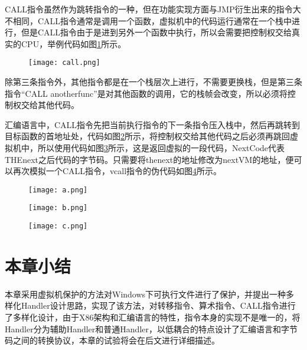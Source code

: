 CALL指令虽然作为跳转指令的一种，但在功能实现方面与JMP衍生出来的指令大不相同，CALL指令通常是调用一个函数，虚拟机中的代码运行通常在一个栈中进行，但是CALL指令由于是进到另外一个函数中执行，所以会需要把控制权交给真实的CPU，举例代码如图\ref{call1}所示。

\begin{figure}[htbp]
	\centering
	\texttt{[image: call.png]}
	\label{call1}
\end{figure}

除第三条指令外，其他指令都是在一个栈层次上进行，不需要更换栈，但是第三条指令“CALL anotherfunc”是对其他函数的调用，它的栈帧会改变，所以必须将控制权交给其他代码。

汇编语言中，CALL指令先把当前执行指令的下一条指令压入栈中，然后再跳转到目标函数的首地址处，代码如图\ref{a}所示，将控制权交给其他代码之后必须再跳回虚拟机中，所以使用代码如图\ref{b}所示，这是返回虚拟的一段代码，NextCode代表THEnext之后代码的字节码。只需要将thenext的地址修改为nextVM的地址，便可以再次模拟一个CALL指令，vcall指令的伪代码如图\ref{c}所示。


\begin{figure}[htbp]
	\centering
	\texttt{[image: a.png]}
	\label{a}
\end{figure}

\begin{figure}[htbp]
	\centering
	\texttt{[image: b.png]}
	\label{b}
\end{figure}

\begin{figure}[htbp]
	\centering
	\texttt{[image: c.png]}
	\label{c}
\end{figure}



\section{本章小结}
本章采用虚拟机保护的方法对Windows下可执行文件进行了保护，并提出一种多样化Handler设计思路，实现了该方法，对转移指令、算术指令、CALL指令进行了多样化设计，由于X86架构和汇编语言的特性，指令本身的实现不是唯一的，将Handler分为辅助Handler和普通Handler，以低耦合的特点设计了汇编语言和字节码之间的转换协议，本章的试验将会在后文进行详细描述。